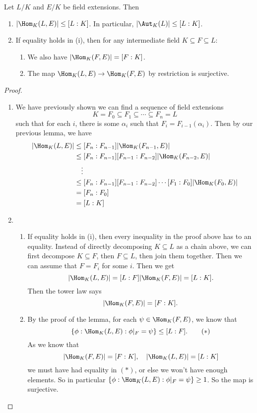 \documentclass[a4paper]{article}
\begin{document}
\begin{thm}
  Let $L/K$ and $E/K$ be field extensions. Then
  \begin{enumerate}
    \item $|\Hom_K(L, E)| \leq [L:K]$. In particular, $|\Aut_K(L)| \leq [L:K]$.
    \item If equality holds in (i), then for any intermediate field $K \subseteq F \subseteq L$:
      \begin{enumerate}
        \item We also have $|\Hom_K(F, E)| = [F:K]$.
        \item The map $\Hom_K(L, E) \to \Hom_K(F, E)$ by restriction is surjective.
      \end{enumerate}
  \end{enumerate}
\end{thm}

\begin{proof}\leavevmode
  \begin{enumerate}
    \item We have previously shown we can find a sequence of field extensions
      \[
        K = F_0 \subseteq F_1 \subseteq\cdots \subseteq F_n = L
      \]
      such that for each $i$, there is some $\alpha_i$ such that $F_i = F_{i - 1}(\alpha_i)$. Then by our previous lemma, we have
      \begin{align*}
        |\Hom_K(L, E)| &\leq [F_n:F_{n - 1}] |\Hom_K(F_{n - 1}, E)|\\
        &\leq [F_n: F_{n - 1}][F_{n - 1}: F_{n - 2}] |\Hom_K(F_{n - 2}, E)|\\
        &\quad \vdots\\
        &\leq [F_n:F_{n - 1}][F_{n - 1}:F_{n - 2}] \cdots [F_1:F_0] |\Hom_K(F_0, E)|\\
        &= [F_n:F_0]\\
        &= [L:K]
      \end{align*}
    \item
    \begin{enumerate}
      \item If equality holds in (i), then every inequality in the proof above has to an equality. Instead of directly decomposing $K \subseteq L$ as a chain above, we can first decompose $K \subseteq F$, then $F \subseteq L$, then join them together. Then we can assume that $F = F_i$ for some $i$. Then we get
        \[
          |\Hom_K(L, E)| = [L:F] |\Hom_K(F, E)| = [L:K].
        \]
        Then the tower law says
        \[
          |\Hom_K(F, E)| = [F:K].
        \]
      \item By the proof of the lemma, for each $\psi \in \Hom_K(F, E)$, we know that
        \[
          \{\phi: \Hom_K(L, E): \phi|_F = \psi\} \leq [L:F].\tag{$*$}
        \]
        As we know that
        \[
          |\Hom_K(F, E)| = [F:K],\quad |\Hom_K(L, E)| = [L:K]
        \]
        we must have had equality in $(*)$, or else we won't have enough elements. So in particular $\{\phi: \Hom_K(L, E): \phi|_F = \psi\} \geq 1$. So the map is surjective.
    \end{enumerate}
  \end{enumerate}
\end{proof}
\end{document}
